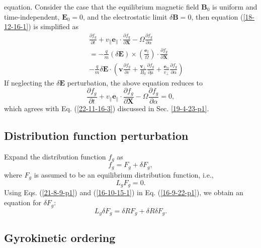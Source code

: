 \documentclass{article}
\newcommand{\tmmathbf}[1]{\ensuremath{\boldsymbol{#1}}}
\begin{document}
equation. Consider the case that the equilibrium magnetic field $\mathbf{B}_0$
is uniform and time-independent, $\mathbf{E}_0 = 0$, and the electrostatic
limit $\delta \mathbf{B}= 0$, then equation (\ref{18-12-16-1}) is simplified
as
\begin{eqnarray}
  &  & \frac{\partial f_g}{\partial t} + v_{\parallel} \mathbf{e}_{\parallel}
  \cdot \frac{\partial f_g}{\partial \mathbf{X}} - \Omega \frac{\partial
  f_g}{\partial \alpha} \nonumber\\
  &  & = - \frac{q}{m} (\delta \mathbf{E}) \times \left(
  \frac{\tmmathbf{e}_{\parallel}}{\Omega}  \right) \cdot \frac{\partial
  f_g}{\partial \mathbf{X}} \\
  &  & - \frac{q}{m} \delta \mathbf{E} \cdot \left( \mathbf{v} \frac{\partial
  f_g}{\partial \varepsilon} + \frac{\mathbf{v}_{\perp}}{B_0}  \frac{\partial
  f_g}{\partial \mu} + \frac{\tmmathbf{e}_{\alpha}}{v_{\perp}}  \frac{\partial
  f_g}{\partial \alpha} \right) 
\end{eqnarray}
If neglecting the $\delta \mathbf{E}$ perturbation, the above equation reduces
to
\begin{equation}
  \frac{\partial f_g}{\partial t} + v_{\parallel} \mathbf{e}_{\parallel} \cdot
  \frac{\partial f_g}{\partial \mathbf{X}} - \Omega \frac{\partial
  f_g}{\partial \alpha} = 0,
\end{equation}
which agrees with Eq. (\ref{22-11-16-3}) discussed in Sec. \ref{19-4-23-p1}.

\subsection{Distribution function perturbation}

Expand the distribution function $f_g$ as
\begin{equation}
  \label{21-8-9-p1} f_g = F_g + \delta F_g,
\end{equation}
where $F_g$ is assumed to be an equilibrium distribution function, i.e.,
\begin{equation}
  \label{16-10-15-1} L_g F_g = 0.
\end{equation}
Using Eqs. (\ref{21-8-9-p1}) and (\ref{16-10-15-1}) in Eq. (\ref{16-9-22-p1}),
we obtain an equation for $\delta F_g$:
\begin{equation}
  \label{16-9-23-p1} L_g \delta F_g = \delta R F_g + \delta R \delta F_g .
\end{equation}

\subsection{Gyrokinetic ordering}
\end{document}
